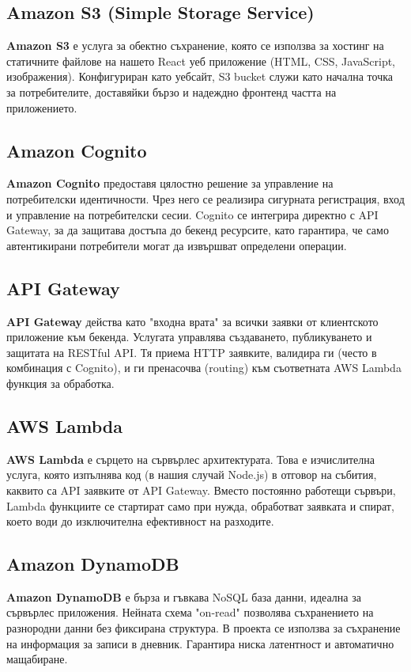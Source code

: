 \documentclass[12pt]{article}
\begin{document}
\subsection{Amazon S3 (Simple Storage Service)}
\textbf{Amazon S3} е услуга за обектно съхранение, която се използва за хостинг на статичните файлове на нашето React уеб приложение (HTML, CSS, JavaScript, изображения). Конфигуриран като уебсайт, S3 bucket служи като начална точка за потребителите, доставяйки бързо и надеждно фронтенд частта на приложението.

\subsection{Amazon Cognito}
\textbf{Amazon Cognito} предоставя цялостно решение за управление на потребителски идентичности. Чрез него се реализира сигурната регистрация, вход и управление на потребителски сесии. Cognito се интегрира директно с API Gateway, за да защитава достъпа до бекенд ресурсите, като гарантира, че само автентикирани потребители могат да извършват определени операции.

\subsection{API Gateway}
\textbf{API Gateway} действа като "входна врата" за всички заявки от клиентското приложение към бекенда. Услугата управлява създаването, публикуването и защитата на RESTful API. Тя приема HTTP заявките, валидира ги (често в комбинация с Cognito), и ги пренасочва (routing) към съответната AWS Lambda функция за обработка.

\subsection{AWS Lambda}
\textbf{AWS Lambda} е сърцето на сървърлес архитектурата. Това е изчислителна услуга, която изпълнява код (в нашия случай Node.js) в отговор на събития, каквито са API заявките от API Gateway. Вместо постоянно работещи сървъри, Lambda функциите се стартират само при нужда, обработват заявката и спират, което води до изключителна ефективност на разходите.

\subsection{Amazon DynamoDB}
\textbf{Amazon DynamoDB} е бърза и гъвкава NoSQL база данни, идеална за сървърлес приложения. Нейната схема "on-read" позволява съхранението на разнородни данни без фиксирана структура. В проекта се използва за съхранение на информация за записи в дневник. Гарантира ниска латентност и автоматично мащабиране.
\end{document}
